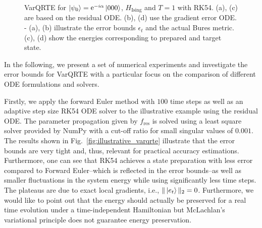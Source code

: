 \documentclass[twocolumn, aps, pra, superscriptaddress]{revtex4-1}
\DeclareMathOperator{\ee}{e}
\begin{document}
\begin{figure}[!ht]
    \centering
    \captionsetup{singlelinecheck = false, format= hang, justification=centerlast, font=footnotesize, labelsep=space}
    \caption{VarQRTE for $\ket{\psi_0}=\ee^{-i\alpha}\ket{000}$, $H_{\text{Ising}}$ and $T=1$ with RK54. (a), (c) are based on the residual ODE.  (b), (d) use the gradient error ODE. - (a), (b) illustrate the error bounds $\epsilon_t$ and the actual Bures metric. (c), (d) show the energies corresponding to prepared and target state.}
    \label{fig:ising_varqrte}
\end{figure}

In the following, we present a set of numerical experiments and investigate the error bounds for VarQRTE with a particular focus on the comparison of different ODE formulations and solvers.

Firstly, we apply the forward Euler method with $100$ time steps as well as an adaptive step size RK54 ODE solver to the illustrative example using the residual ODE. The parameter propagation given by $f_{\text{res}}$ is solved using a least square solver provided by NumPy \cite{Numpy2020} with a cut-off ratio for small singular values of $0.001$.
The results shown in Fig.~\ref{fig:illustrative_varqrte} illustrate that the error bounds are very tight and, thus, relevant for practical accuracy estimations.  
Furthermore, one can see that RK54 achieves a state preparation with less error compared to Forward Euler--which is reflected in the error bounds--as well as smaller fluctuations in the system energy while using significantly less time steps. The plateaus are due to exact local gradients, i.e., $\|\ket{e_{t}}\|_2 = 0$.
Furthermore, we would like to point out that the energy should actually be preserved for a real time evolution under a time-independent Hamiltonian but McLachlan's variational principle does not guarantee energy preservation.
\end{document}
